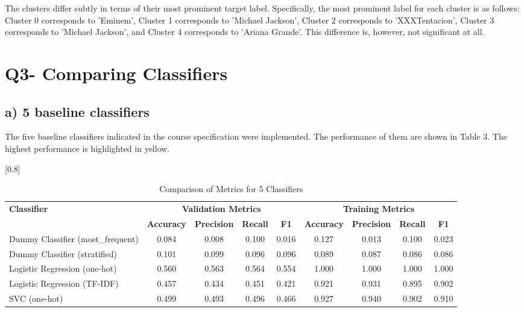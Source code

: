 \documentclass[a4paper,11pt]{article}
\begin{document}
The clusters differ subtly in terms of their most prominent target label. 
Specifically, the most prominent label for each cluster is as follows: Cluster 0 corresponds to 'Eminem', Cluster 1 corresponds to 'Michael Jackson', Cluster 2 corresponds to 'XXXTentacion', Cluster 3 corresponds to 'Michael Jackson', and Cluster 4 corresponds to 'Ariana Grande'.
This difference is, however, not significant at all.





\section{Q3- Comparing Classifiers}
\subsection{a) 5 baseline classifiers}
The five baseline classifiers indicated in the course specification were implemented.
The performance of them are shown in Table 3.
The highest performance is highlighted in yellow.

\begin{table}[htbp]
    \centering
    \caption{Comparison of Metrics for 5 Classifiers}
    \label{tab:classifier_metrics}
    \small
    \scalebox{0.8}[0.8]{
    \begin{tabular}{l|cccc|cccc}
        \hline
        \textbf{Classifier} & \multicolumn{4}{c|}{\textbf{Validation Metrics}} & \multicolumn{4}{c}{\textbf{Training Metrics}} \\
        & \textbf{Accuracy} & \textbf{Precision} & \textbf{Recall} & \textbf{F1} & \textbf{Accuracy} & \textbf{Precision} & \textbf{Recall} & \textbf{F1} \\
        \hline
        Dummy Classifier (most\_frequent) & {0.084} & 0.008 & 0.100 & 0.016 & 0.127 & 0.013 & 0.100 & 0.023 \\
        Dummy Classifier (stratified) & 0.101 & 0.099 & 0.096 & 0.096 & 0.089 & 0.087 & 0.086 & 0.086 \\
        \rowcolor[rgb]{0.9,0.9,0}Logistic Regression (one-hot) & \colorbox[rgb]{0.9, 0.9, 0}{0.560} & \colorbox[rgb]{0.9, 0.9, 0}{0.563} & \colorbox[rgb]{0.9, 0.9, 0}{0.564} & \colorbox[rgb]{0.9, 0.9, 0}{0.554} & 1.000 & 1.000 & 1.000 & 1.000 \\
        Logistic Regression (TF-IDF) & 0.457 & 0.434 & 0.451 & 0.421 & 0.921 & 0.931 & 0.895 & 0.902 \\
        SVC (one-hot) & 0.499 & 0.493 & 0.496 & 0.466 & 0.927 & 0.940 & 0.902 & 0.910 \\
        \hline
    \end{tabular}
    }
\end{table}
\end{document}
